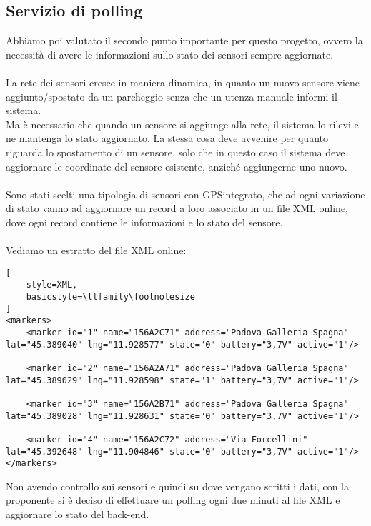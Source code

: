 \subsection{Servizio di polling}
Abbiamo poi valutato il secondo punto importante per questo progetto, ovvero
la necessità di avere le informazioni sullo stato dei sensori sempre aggiornate.
\\\\
La rete dei sensori cresce in maniera dinamica, in quanto un nuovo sensore viene aggiunto/spostato
da un parcheggio senza che un utenza manuale informi il sistema. 
\\
Ma è necessario che quando un sensore si aggiunge alla rete, il sistema lo rilevi e ne mantenga lo stato
aggiornato. La stessa cosa deve avvenire per quanto riguarda lo spostamento di un sensore, solo che in 
questo caso il sistema deve aggiornare le coordinate del sensore esistente, anziché aggiungerne uno nuovo.
\\\\
Sono stati scelti una tipologia di sensori con \gls{GPS}\glsfirstoccur integrato, che ad ogni variazione di stato vanno ad 
aggiornare un record a loro associato in un file \gls{XML} online, dove ogni record contiene le informazioni e
lo stato del sensore.
\\\\
Vediamo un estratto del file \gls{XML} online:
\begin{lstlisting}[
    style=XML,
    basicstyle=\ttfamily\footnotesize
]
<markers>
    <marker id="1" name="156A2C71" address="Padova Galleria Spagna" lat="45.389040" lng="11.928577" state="0" battery="3,7V" active="1"/>
    
    <marker id="2" name="156A2A71" address="Padova Galleria Spagna" lat="45.389029" lng="11.928598" state="1" battery="3,7V" active="1"/>
    
    <marker id="3" name="156A2B71" address="Padova Galleria Spagna" lat="45.389028" lng="11.928631" state="0" battery="3,7V" active="1"/>
    
    <marker id="4" name="156A2C72" address="Via Forcellini" lat="45.392648" lng="11.904846" state="0" battery="3,7V" active="1"/>
</markers>
\end{lstlisting}
\leavevmode\newline
Non avendo controllo sui sensori e quindi su dove vengano scritti i dati, con la proponente si è deciso
di effettuare un polling ogni due minuti al file \gls{XML} e aggiornare lo stato del \gls{back-end}.
\\\\
